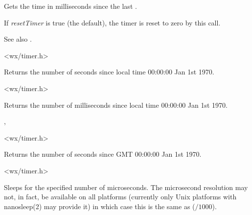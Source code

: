 Gets the time in milliseconds since the last .

If {\it resetTimer} is true (the default), the timer is reset to zero
by this call.

See also .


<wx/timer.h>


\label{wxgetlocaltime}


Returns the number of seconds since local time 00:00:00 Jan 1st 1970.




<wx/timer.h>


\label{wxgetlocaltimemillis}


Returns the number of milliseconds since local time 00:00:00 Jan 1st 1970.


,\\


<wx/timer.h>


\label{wxgetutctime}


Returns the number of seconds since GMT 00:00:00 Jan 1st 1970.




<wx/timer.h>


\label{wxmicrosleep}


Sleeps for the specified number of microseconds. The microsecond resolution may
not, in fact, be available on all platforms (currently only Unix platforms with
nanosleep(2) may provide it) in which case this is the same as 
($/1000$).

